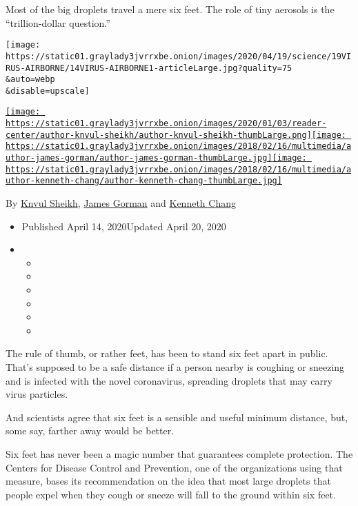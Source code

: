 Most of the big droplets travel a mere six feet. The role of tiny
aerosols is the ``trillion-dollar question.''

\texttt{[image: https://static01.graylady3jvrrxbe.onion/images/2020/04/19/science/19VIRUS-AIRBORNE/14VIRUS-AIRBORNE1-articleLarge.jpg?quality=75\\\&auto=webp\\\&disable=upscale]}

\href{https://www.nytimes3xbfgragh.onion/by/knvul-sheikh}{\texttt{[image: https://static01.graylady3jvrrxbe.onion/images/2020/01/03/reader-center/author-knvul-sheikh/author-knvul-sheikh-thumbLarge.png]}}\href{https://www.nytimes3xbfgragh.onion/by/james-gorman}{\texttt{[image: https://static01.graylady3jvrrxbe.onion/images/2018/02/16/multimedia/author-james-gorman/author-james-gorman-thumbLarge.jpg]}}\href{https://www.nytimes3xbfgragh.onion/by/kenneth-chang}{\texttt{[image: https://static01.graylady3jvrrxbe.onion/images/2018/02/16/multimedia/author-kenneth-chang/author-kenneth-chang-thumbLarge.jpg]}}

By \href{https://www.nytimes3xbfgragh.onion/by/knvul-sheikh}{Knvul
Sheikh}, \href{https://www.nytimes3xbfgragh.onion/by/james-gorman}{James
Gorman} and
\href{https://www.nytimes3xbfgragh.onion/by/kenneth-chang}{Kenneth
Chang}

\begin{itemize}
\item
  Published April 14, 2020Updated April 20, 2020
\item
  \begin{itemize}
  \item
  \item
  \item
  \item
  \item
  \item
  \end{itemize}
\end{itemize}

The rule of thumb, or rather feet, has been to stand six feet apart in
public. That's supposed to be a safe distance if a person nearby is
coughing or sneezing and is infected with the novel coronavirus,
spreading droplets that may carry virus particles.

And scientists agree that six feet is a sensible and useful minimum
distance, but, some say, farther away would be better.

Six feet has never been a magic number that guarantees complete
protection. The Centers for Disease Control and Prevention, one of the
organizations using that measure, bases its recommendation on the idea
that most large droplets that people expel when they cough or sneeze
will fall to the ground within six feet.

